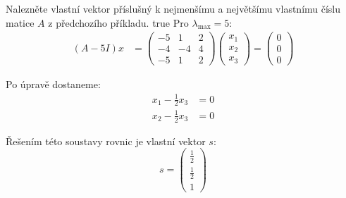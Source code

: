 \documentclass[10pt, a4paper]{ReportSheet}
\begin{document}
\begin{uloha}{4}{3}{
        Nalezněte vlastní vektor příslušný k nejmenšímu a největšímu vlastnímu číslu matice $A$ z předchozího příkladu.
    }{true}
        Pro $\lambda_{\max} = 5$:
        \begin{equation*}
            \begin{aligned}
            (A - 5I)
                x &= \begin{pmatrix}
                         -5 & 1  & 2 \\
                         -4 & -4 & 4 \\
                         -5 & 1  & 2
                \end{pmatrix} \begin{pmatrix}
                                  x_1 \\
                                  x_2 \\
                                  x_3
                \end{pmatrix} = \begin{pmatrix}
                                    0 \\
                                    0 \\
                                    0
                \end{pmatrix}
            \end{aligned}
        \end{equation*}

        Po úpravě dostaneme:
        \begin{equation*}
            \begin{aligned}
                x_1 - \frac{1}{2}x_3 &= 0 \\
                x_2 - \frac{1}{2}x_3 &= 0
            \end{aligned}
        \end{equation*}

        Řešením této soustavy rovnic je vlastní vektor $s$:
        \begin{equation*}
            s = \begin{pmatrix}
                    \frac{1}{2} \\
                    \frac{1}{2} \\
                    1
            \end{pmatrix}
        \end{equation*}

    \end{uloha}
\end{document}

